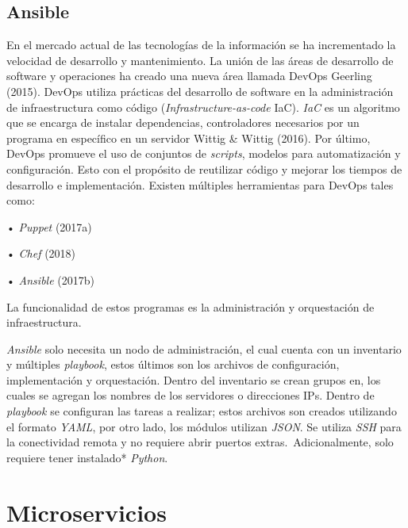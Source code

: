 \documentclass[12pt,twoside]{reedthesis}
\theoremstyle{definition}
\theoremstyle{definition}
\theoremstyle{definition}
\theoremstyle{remark}
\begin{document}
\hypertarget{ansible}{%
\subsection{Ansible}\label{ansible}}

En el mercado actual de las tecnologías de la información se ha
incrementado la velocidad de desarrollo y mantenimiento. La unión de las
áreas de desarrollo de software y operaciones ha creado una nueva área
llamada DevOps Geerling (2015). DevOps utiliza prácticas del desarrollo
de software en la administración de infraestructura como código
(\emph{Infrastructure-as-code} IaC). \emph{IaC} es un algoritmo que se
encarga de instalar dependencias, controladores necesarios por un
programa en específico en un servidor Wittig \& Wittig (2016). Por
último, DevOps promueve el uso de conjuntos de \emph{scripts}, modelos
para automatización y configuración. Esto con el propósito de reutilizar
código y mejorar los tiempos de desarrollo e implementación. Existen
múltiples herramientas para DevOps tales como:~

• \emph{Puppet} (2017a)~

• \emph{Chef} (2018)~

• \emph{Ansible} (2017b)

La funcionalidad de estos programas es la administración y orquestación
de infraestructura.

\emph{Ansible} solo necesita un nodo de administración, el cual cuenta
con un inventario y múltiples \emph{playbook}, estos últimos son los
archivos de configuración, implementación y orquestación. Dentro del
inventario se crean grupos en, los cuales se agregan los nombres de los
servidores o direcciones IPs. Dentro de \emph{playbook} se configuran
las tareas a realizar; estos archivos son creados utilizando el formato
\emph{YAML}, por otro lado, los módulos utilizan \emph{JSON}. Se utiliza
\emph{SSH} para la conectividad remota y no requiere abrir puertos
extras.~Adicionalmente, solo requiere tener instalado* \emph{Python}.

\hypertarget{microservicios}{%
\section{Microservicios}\label{microservicios}}
\end{document}
